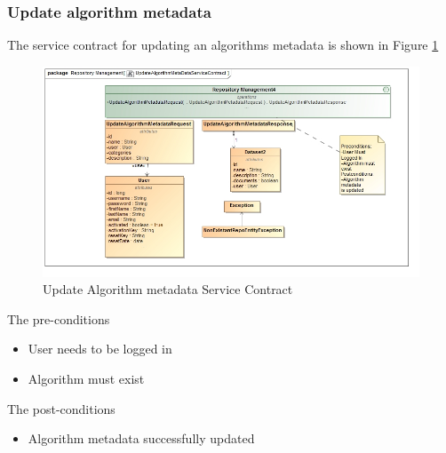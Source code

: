 \subsubsection {Update algorithm metadata}
The service contract for updating an algorithms metadata is shown in Figure \ref{fig:updateAlgorithmMetadataServiceContract}
\begin{figure}[H]
	\begin{center}
		\includegraphics[scale=0.6]{../Diagrams and Charts/Test Data/UpdateAlgorithmMetadataServiceContract.jpg}
		\caption{Update Algorithm metadata Service Contract}
		\label{fig:updateAlgorithmMetadataServiceContract}
	\end{center}
	
\end{figure}

The pre-conditions
\begin{itemize}
	\item User needs to be logged in
	\item Algorithm must exist
\end{itemize}

The post-conditions
\begin{itemize}
	\item Algorithm metadata successfully updated
\end{itemize}

